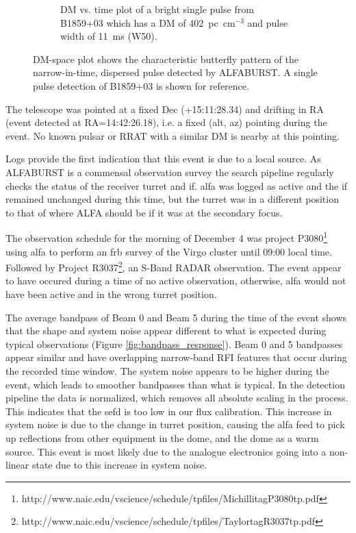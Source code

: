 \documentclass[a4paper,fleqn,usenatbib]{mnras}
\begin{document}
\begin{figure}
\begin{subfigure}[t]{0.5\textwidth}
        \caption{DM vs. time plot of a bright single pulse from B1859+03 which
        has a DM of 402~pc~cm$^{-3}$ and pulse width of 11~ms (W50).
        }
        \label{fig:dm_time_B1859}
    \end{subfigure}
    \caption{DM-space plot shows the characteristic butterfly pattern of the
    narrow-in-time, dispersed pulse detected by ALFABURST. A single pulse
    detection of B1859+03 is shown for reference.
    }
    \label{fig:dm_time}
\end{figure}

The telescope was pointed at a fixed Dec (+15:11:28.34) and drifting in RA
(event detected at RA=14:42:26.18), i.e. a fixed (alt, az) pointing during the
event. No known pulsar or RRAT with a similar DM is nearby at this pointing.

Logs provide the first indication that this event is due to a local source.  As
ALFABURST is a commensal observation survey the search pipeline regularly checks
the status of the receiver turret and \gls{if}. \gls{alfa} was logged as active and
the \gls{if} remained unchanged during this time, but the turret was in a
different position to that of where ALFA should be if it was at the secondary
focus.

The observation schedule for the morning of December 4 was project
P3080\footnote{http://www.naic.edu/vscience/schedule/tpfiles/MichillitagP3080tp.pdf}
using \gls{alfa} to perform an \gls{frb} survey of the Virgo cluster until 09:00
local time.  Followed by Project
R3037\footnote{http://www.naic.edu/vscience/schedule/tpfiles/TaylortagR3037tp.pdf},
an S-Band RADAR observation.  The event appear to have occured during a time of
no active observation, otherwise, \gls{alfa} would not have been active and in
the wrong turret position.

The average bandpass of Beam 0 and Beam 5 during the time of the event shows
that the shape and system noise appear different to what is expected during
typical observations (Figure \ref{fig:bandpass_response}).  Beam 0 and 5
bandpasses appear similar and have overlapping narrow-band RFI features that
occur during the recorded time window.  The system noise appears to be higher
during the event, which leads to smoother bandpasses than what is typical.  In
the detection pipeline the data is normalized, which removes all absolute
scaling in the process. This indicates that the \gls{sefd} is too low in our
flux calibration.  This increase in system noise is due to the change in turret
position, causing the \gls{alfa} feed to pick up reflections from other
equipment in the dome, and the dome as a warm source.  This event is most likely
due to the analogue electronics going into a non-linear state due to this
increase in system noise.
\end{document}
